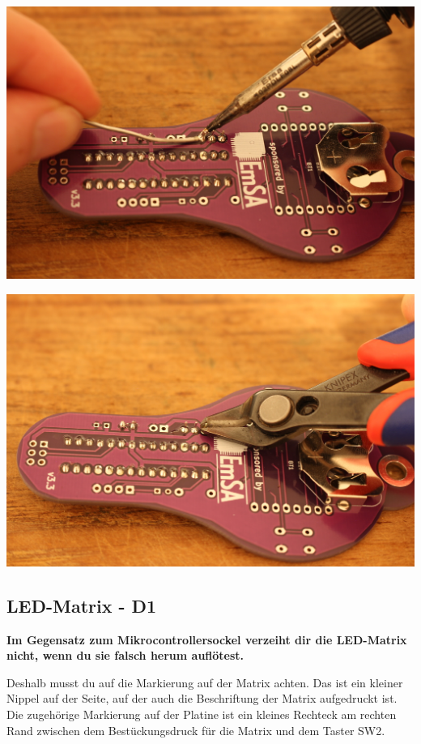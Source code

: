 \documentclass{article}
\begin{document}
\begin{minipage}[b]{0.5\textwidth}
	\includegraphics[width=\textwidth]{Bilder2024/IMG_0059.JPG}
\end{minipage}
\begin{minipage}[b]{0.5\textwidth}
	\includegraphics[width=\textwidth]{Bilder2024/IMG_0061.JPG}
\end{minipage}

\subsection{LED-Matrix - D1}

\textbf{Im Gegensatz zum Mikrocontrollersockel verzeiht dir die LED-Matrix nicht, wenn du sie falsch herum auflötest.} 

Deshalb musst du auf die Markierung auf der Matrix achten. Das ist ein kleiner Nippel auf der Seite, auf der auch die Beschriftung der Matrix aufgedruckt ist. Die zugehörige Markierung auf der Platine ist ein kleines Rechteck am rechten Rand zwischen dem Bestückungsdruck für die Matrix und dem Taster SW2.
\end{document}
